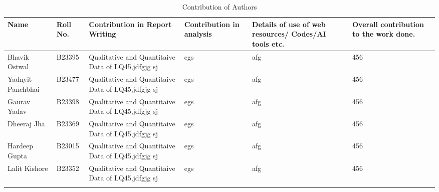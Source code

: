 
\begin{table}[H]
    \centering
    \caption{Contribution of Authors}
    \begin{tabular}{|p{1.8cm}|p{1.5cm}|p{3cm}|p{2.5cm}|p{2cm}|p{2.5cm}|}
        \hline
        \textbf{Name} & \textbf{Roll No.} & \textbf{Contribution in Report Writing} & \textbf{Contribution in analysis} &\textbf{Details of use of web resources/ Codes/AI tools etc.} & \textbf{Overall contribution to the work done.} \\
        \hline
        Bhavik Ostwal & B23395 & Qualitative and Quantitaive Data of LQ45,jdfgjg sj & egs & afg & 456 \\
        \hline
        Yadnyit Panchbhai & B23477 & Qualitative and Quantitaive Data of LQ45,jdfgjg sj & egs & afg & 456  \\
        \hline
        Gaurav Yadav & B23398 & Qualitative and Quantitaive Data of LQ45,jdfgjg sj & egs & afg & 456  \\
        \hline
        Dheeraj Jha & B23369 & Qualitative and Quantitaive Data of LQ45,jdfgjg sj & egs & afg & 456  \\
        \hline
        Hardeep Gupta & B23015 & Qualitative and Quantitaive Data of LQ45,jdfgjg sj & egs & afg & 456  \\
        \hline
        Lalit Kishore & B23352 & Qualitative and Quantitaive Data of LQ45,jdfgjg sj & egs & afg & 456  \\
        \hline
    \centering
    \end{tabular}
\end{table}


